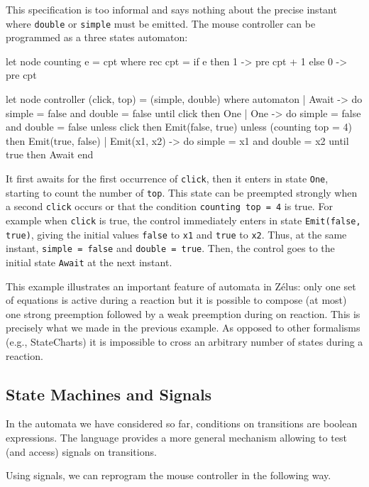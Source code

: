 \documentclass[11pt,titlepage,twoside]{report}
\newcommand{\zelus}{{\sf Z\'elus}}
\newcommand{\statecharts}{{\sf StateCharts}}
\begin{document}
This specification is too informal and says nothing about the precise
instant where \verb-double- or \verb-simple- must be emitted.  The
mouse controller can be programmed as a three states automaton:

\begin{runverbatim}
let node counting e = cpt where
  rec cpt = if e then 1 -> pre cpt + 1 else 0 -> pre cpt

let node controller (click, top) = (simple, double) where
  automaton
  | Await ->
     do  simple = false and double = false
     until click then One
  | One ->
     do  simple = false and double = false
     unless click then Emit(false, true)
     unless (counting top = 4) then Emit(true, false)
  | Emit(x1, x2) ->
     do simple = x1 and double = x2
     until true then Await
  end
\end{runverbatim}

It first awaits for the first occurrence of \verb-click-, then it
enters in state \verb-One-, starting to count the number of
\verb-top-. This state can be preempted strongly when a second
\verb-click- occurs or that the condition \verb-counting top = 4- is
true. For example when \verb-click- is true, the control immediately
enters in state \verb-Emit(false, true)-, giving the initial values
\verb-false- to \verb-x1- and \verb-true- to \verb-x2-. Thus, at the
same instant, \verb-simple = false- and \verb-double = true-. Then,
the control goes to the initial state \verb-Await- at the next
instant.

This example illustrates an important feature of automata in \zelus:
only one set of equations is active during a reaction but it is
possible to compose (at most) one strong preemption followed by a weak
preemption during on reaction. This is precisely what we made in the
previous example. As opposed to other formalisms (e.g., \statecharts)
it is impossible to cross an arbitrary number of states during a
reaction.

\subsection{State Machines and Signals}
In the automata we have considered so far, conditions on transitions
are boolean expressions. The language provides a more general
mechanism allowing to test (and access) signals on transitions.

Using signals, we can reprogram the mouse controller in the following
way.
\end{document}
